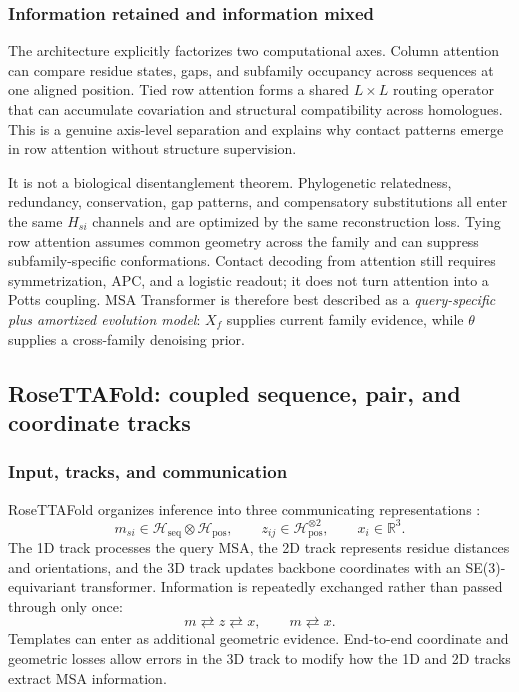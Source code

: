 \documentclass[10pt]{article}
\newcommand{\R}{\mathbb R}
\begin{document}
\subsubsection{Information retained and information mixed}

The architecture explicitly factorizes two computational axes.  Column attention can compare
residue states, gaps, and subfamily occupancy across sequences at one aligned position.  Tied row
attention forms a shared $L\times L$ routing operator that can accumulate covariation and structural
compatibility across homologues.  This is a genuine axis-level separation and explains why contact
patterns emerge in row attention without structure supervision.

It is not a biological disentanglement theorem.  Phylogenetic relatedness, redundancy,
conservation, gap patterns, and compensatory substitutions all enter the same $H_{si}$ channels and
are optimized by the same reconstruction loss.  Tying row attention assumes common geometry across
the family and can suppress subfamily-specific conformations.  Contact decoding from attention
still requires symmetrization, APC, and a logistic readout; it does not turn attention into a Potts
coupling.  MSA Transformer is therefore best described as a \emph{query-specific plus amortized
evolution model}: $X_f$ supplies current family evidence, while $\theta$ supplies a cross-family
denoising prior.

\subsection{RoseTTAFold: coupled sequence, pair, and coordinate tracks}

\subsubsection{Input, tracks, and communication}

RoseTTAFold organizes inference into three communicating representations \cite{baek2021}:
\begin{equation}
m_{si}\in\mathcal H_{\mathrm{seq}}\otimes\mathcal H_{\mathrm{pos}},
\qquad
z_{ij}\in\mathcal H_{\mathrm{pos}}^{\otimes2},
\qquad
x_i\in\R^3.
\label{eq:rosettafold-tracks}
\end{equation}
The 1D track processes the query MSA, the 2D track represents residue distances and orientations,
and the 3D track updates backbone coordinates with an SE(3)-equivariant transformer.  Information
is repeatedly exchanged rather than passed through only once:
\begin{equation}
m\rightleftarrows z\rightleftarrows x,
\qquad m\rightleftarrows x.
\label{eq:rosettafold-communication}
\end{equation}
Templates can enter as additional geometric evidence.  End-to-end coordinate and geometric losses
allow errors in the 3D track to modify how the 1D and 2D tracks extract MSA information.
\end{document}
